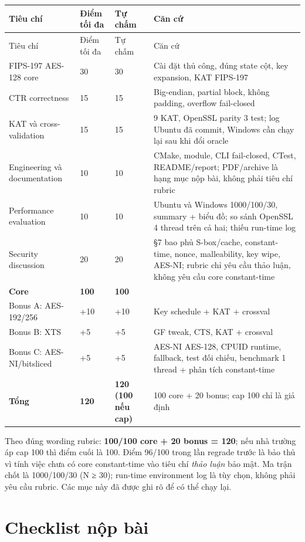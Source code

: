 \documentclass[12pt,a4paper,oneside]{report}
\begin{document}
\begin{longtable}{p{}p{}p{}p{}}
\toprule
Tiêu chí & Điểm tối đa & Tự chấm & Căn cứ \\
\midrule
\endfirsthead
\toprule
Tiêu chí & Điểm tối đa & Tự chấm & Căn cứ \\
\midrule
\endhead
FIPS-197 AES-128 core & 30 & 30 & Cài đặt thủ công, đúng state cột, key expansion, KAT FIPS-197 \\
CTR correctness & 15 & 15 & Big-endian, partial block, không padding, overflow fail-closed \\
KAT và cross-validation & 15 & 15 & 9 KAT, OpenSSL parity 3 test; log Ubuntu đã commit, Windows cần chạy lại sau khi đổi oracle \\
Engineering và documentation & 10 & 10 & CMake, module, CLI fail-closed, CTest, README/report; PDF/archive là hạng mục nộp bài, không phải tiêu chí rubric \\
Performance evaluation & 10 & 10 & Ubuntu và Windows 1000/100/30, summary + biểu đồ; so sánh OpenSSL 4 thread trên cả hai; thiếu run-time log \\
Security discussion & 20 & 20 & §7 bao phủ S-box/cache, constant-time, nonce, malleability, key wipe, AES-NI; rubric chỉ yêu cầu thảo luận, không yêu cầu core constant-time \\
\textbf{Core} & \textbf{100} & \textbf{100} &  \\
Bonus A: AES-192/256 & +10 & +10 & Key schedule + KAT + crossval \\
Bonus B: XTS & +5 & +5 & GF tweak, CTS, KAT + crossval \\
Bonus C: AES-NI/bitsliced & +5 & +5 & AES-NI AES-128, CPUID runtime, fallback, test đối chiếu, benchmark 1 thread + phân tích constant-time \\
\textbf{Tổng} & \textbf{120} & \textbf{120 (100 nếu cap)} & 100 core + 20 bonus; cap 100 chỉ là giả định \\
\bottomrule
\end{longtable}


Theo đúng wording rubric: \textbf{100/100 core + 20 bonus = 120}; nếu nhà trường áp cap 100 thì điểm cuối là 100. Điểm 96/100 trong lần regrade trước là bảo thủ vì tính việc chưa có core constant-time vào tiêu chí \emph{thảo luận} bảo mật. Ma trận chốt là 1000/100/30 (N ≥ 30); run-time environment log là tùy chọn, không phải yêu cầu rubric. Các mục này đã được ghi rõ để có thể chạy lại.


\section{Checklist nộp bài}
\end{document}
